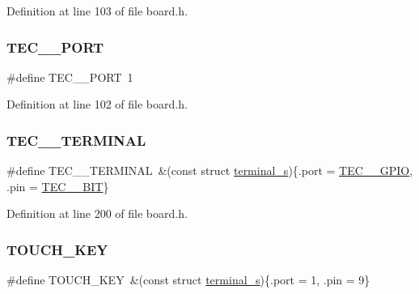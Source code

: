Definition at line 103 of file board.\+h.

\mbox{\label{group__hal_gadd513c832f5c617281c5df0dc67ae80c}} 
\subsubsection{\texorpdfstring{T\+E\+C\+\_\+\_\+\+P\+O\+RT}{TEC\_4\_PORT}}
{\footnotesize\ttfamily \#define T\+E\+C\+\_\+\_\+\+P\+O\+RT~1}



Definition at line 102 of file board.\+h.

\mbox{\label{group__hal_gabc104deb091e5ee6be6445dbd2c5d1ae}} 
\subsubsection{\texorpdfstring{T\+E\+C\+\_\+\_\+\+T\+E\+R\+M\+I\+N\+AL}{TEC\_4\_TERMINAL}}
{\footnotesize\ttfamily \#define T\+E\+C\+\_\+\_\+\+T\+E\+R\+M\+I\+N\+AL~\&(const struct \hyperlink{structterminal__s}{terminal\+\_\+s})\{.port = \hyperlink{group__samples_gaa5418f15596d7ada110c4105aa70e561}{T\+E\+C\+\_\+\_\+\+G\+P\+IO}, .pin = \hyperlink{group__samples_gac7c8a49f0602d0aeee33923ce8708a4b}{T\+E\+C\+\_\+\_\+\+B\+IT}\}}



Definition at line 200 of file board.\+h.

\mbox{\label{group__hal_ga622f361da595a38bbb742894f48f7339}} 
\subsubsection{\texorpdfstring{T\+O\+U\+C\+H\+\_\+\+K\+EY}{TOUCH\_KEY}}
{\footnotesize\ttfamily \#define T\+O\+U\+C\+H\+\_\+\+K\+EY~\&(const struct \hyperlink{structterminal__s}{terminal\+\_\+s})\{.port = 1, .pin = 9\}}



